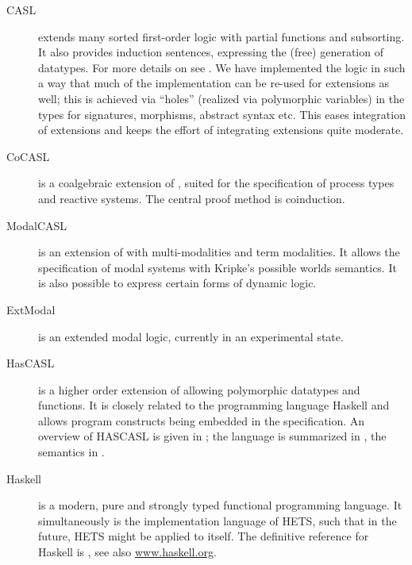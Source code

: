 \documentclass{article}
\newcommand{\normalTEXTSC}[2]{{#1\scriptsize#2}}
\newcommand     {\Hets}{\normalTEXTSC{H}{ETS}\xspace}
\newcommand{\Dolce}{\textmd{\textsc{Dolce}}\xspace}
\newcommand     {\HasCASL}{\normalTEXTSC{H}{AS}\normalTEXTSC{C}{ASL}\xspace}
\begin{document}
\begin{description}

\item[CASL] extends many sorted first-order logic with partial
  functions and subsorting.  It also provides induction sentences,
  expressing the (free) generation of datatypes.
For more details on \CASL see \cite{CASL/RefManual,CASL-UM}.
%
We have implemented the \CASL logic in such a way that much of the
implementation can be re-used for \CASL extensions as well; this
is achieved via ``holes'' (realized via polymorphic variables) in the
types for signatures, morphisms, abstract syntax etc.  This eases
integration of \CASL extensions and keeps the effort of integrating
\CASL extensions quite moderate.

\item[CoCASL] \cite{MossakowskiEA04} is a coalgebraic extension of \CASL,
suited for the specification of process types and reactive systems.
The central proof method is coinduction.

\item[ModalCASL] \cite{ModalCASL}
 is an extension of \CASL with multi-modalities and
term modalities. It allows the specification of modal systems with
Kripke's possible worlds semantics. It is also possible to express
certain forms of dynamic logic.

\item[ExtModal] is an extended modal logic, currently in an experimental state.

\item[HasCASL] is a higher order extension of \CASL allowing
  polymorphic datatypes and functions. It is closely related to the
  programming language Haskell and allows program constructs being
  embedded in the specification.
  An overview of \HasCASL is given in \cite{Schroeder:2002:HIS};
the language is summarized in \cite{HasCASL/Summary}, the semantics
in \cite{Schroder05b,Schroder-habil}.

\item[Haskell] is a modern, pure and strongly typed functional
  programming language. It simultaneously is the implementation
  language of \Hets, such that in the future, \Hets might be applied
  to itself.
The definitive reference for Haskell is \cite{PeytonJones03},
see also \url{www.haskell.org}.


\end{description}
\end{document}
